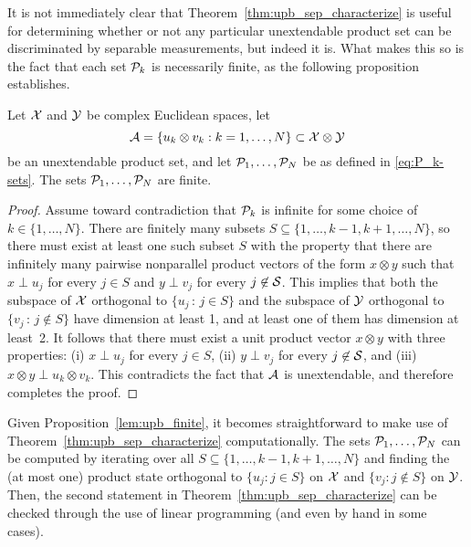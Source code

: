 It is not immediately clear that Theorem~\ref{thm:upb_sep_characterize} is
useful for determining whether or not any particular unextendable product set
can be discriminated by separable measurements, but indeed it is.
What makes this so is the fact that each set $\P_k$ is necessarily finite, as
the following proposition establishes.

\begin{prop}\label{lem:upb_finite}
  Let $\X$ and $\Y$ be complex Euclidean spaces, let
  \[
    \A = \{ u_{k}\otimes v_{k} : k = 1, \ldots, N \} \subset \X\otimes\Y
  \]
  be an unextendable product set, and let $\P_1,\ldots,\P_N$ be as defined in
  \eqref{eq:P_k-sets}.
  The sets $\P_1,\ldots,\P_N$ are finite.
\end{prop}

\begin{proof}
  Assume toward contradiction that $\P_k$ is infinite for some choice of
  $k\in\{1,\ldots,N\}$.
  There are finitely many subsets $S\subseteq \{1,\ldots,k-1,k+1,\ldots,N\}$,
  so  there must exist at least one such subset $S$ with the property that
  there are infinitely many pairwise nonparallel product vectors of the form
  $x\otimes y$ such that $x \perp u_j$ for every $j\in S$ and $y\perp v_j$ for
  every $j\not\in\S$.
  This implies that both the subspace of $\X$ orthogonal to
  $\{u_j\,:\,j\in S\}$ and the subspace of $\Y$ orthogonal to
  $\{v_j\,:\,j\not\in S\}$ have dimension at least 1, and
  at least one of them has dimension at least~2.
  It follows that there must exist a unit product vector $x \otimes y$ with
  three properties:
  (i) $x \perp u_j$ for every $j\in S$,
  (ii) $y \perp v_j$ for every $j\not\in\S$, and
  (iii) $x\otimes y\perp u_k \otimes v_k$.
  This contradicts the fact that $\A$ is unextendable, and therefore completes
  the proof.
\end{proof}

Given Proposition~\ref{lem:upb_finite}, it becomes straightforward to make use
of Theorem~\ref{thm:upb_sep_characterize} computationally.
The sets $\P_1,\ldots,\P_N$ can be computed by iterating over all 
$S \subseteq \{1,\ldots,k-1,k+1,\ldots,N\}$ and
finding the (at most one) product state orthogonal to $\{ u_j : j \in S \}$ on
$\X$ and $\{ v_j : j \notin S \}$ on $\Y$. 
Then, the second statement in Theorem~\ref{thm:upb_sep_characterize} can be
checked through the use of linear programming (and even by hand in some cases).

